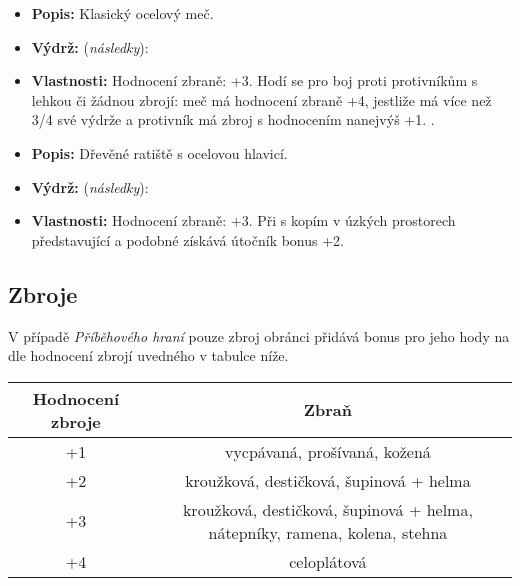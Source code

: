 \documentclass[../main.tex]{subfiles}
\begin{document}
	\begin{Predmet}
	\begin{itemize}
		\item \textbf{Popis:} Klasický ocelový meč. \leavevmode{}
		\item \textbf{Výdrž:} (\emph{následky}): 
		\item \textbf{Vlastnosti:} Hodnocení zbraně: +3. Hodí se pro boj proti protivníkům s lehkou či žádnou zbrojí: meč má hodnocení zbraně +4, jestliže má více než 3/4 své výdrže a protivník má zbroj s hodnocením nanejvýš +1. \leavevmode{}. 
	\end{itemize}
	\end{Predmet}

\begin{Predmet}[Kopí]
\begin{itemize}
	\item \textbf{Popis:} Dřevěné ratiště s ocelovou hlavicí.
	\item \textbf{Výdrž:} (\emph{následky}): 
	\item \textbf{Vlastnosti:} Hodnocení zbraně: +3.  Při  s kopím v úzkých prostorech představující  a podobné získává útočník bonus +2.
\end{itemize}
\end{Predmet}

\subsection{Zbroje}
\label{sec:zbroje}

V případě \emph{Příběhového hraní} pouze zbroj obránci přidává bonus pro jeho hody na  dle hodnocení zbrojí uvedného v tabulce níže.


\begin{table}[h]  
\centering
\begin{tabular}[h]{c|c}
Hodnocení zbroje & Zbraň \\ \hline
+1 & vycpávaná, prošívaná, kožená \\
+2 & kroužková, destičková, šupinová + helma \\
+3 & kroužková, destičková, šupinová + helma, nátepníky, ramena, kolena, stehna\\
+4 & celoplátová\\
\end{tabular}
\end{table}
\end{document}
